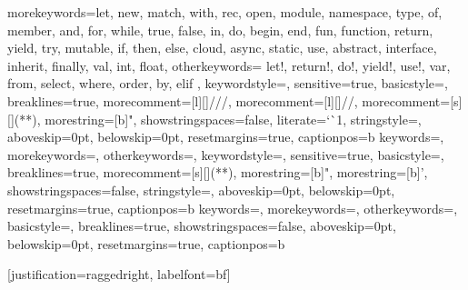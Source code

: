 %
{morekeywords={let, new, match, with, rec, open, module, namespace, type, of, member, %
and, for, while, true, false, in, do, begin, end, fun, function, return, yield, try, %
mutable, if, then, else, cloud, async, static, use, abstract,
interface, inherit, finally, val, int, float},
  otherkeywords={ let!, return!, do!, yield!, use!, var, from, select,
    where, order, by, elif },
  keywordstyle=\color{keywordsColor},
  sensitive=true,
  basicstyle=\ttfamily,
  breaklines=true,
  morecomment=[l][\color{commentsColor}]{///},
  morecomment=[l][\color{commentsColor}]{//},
  morecomment=[s][\color{commentsColor}]{{(*}{*)}},
  morestring=[b]",
  showstringspaces=false,
  literate={`}{\`}1,
  stringstyle=\color{stringsColor},
  aboveskip=0pt, 
  belowskip=0pt,
  resetmargins=true,
  captionpos=b
}
%
{keywords={},
  morekeywords={},
  otherkeywords={},
  keywordstyle=\color{keywordsColor},
  sensitive=true,
  basicstyle=\ttfamily, breaklines=true,
  morecomment=[s][\color{commentsColor}]{{(*}{*)}},
  morestring=[b]",
  morestring=[b]',
  showstringspaces=false,
  stringstyle=\color{stringsColor},
  aboveskip=0pt, 
  belowskip=0pt,
  resetmargins=true,
  captionpos=b
}
%
{keywords={},
  morekeywords={},
  otherkeywords={},
  basicstyle=\ttfamily, breaklines=true,
  showstringspaces=false,
  aboveskip=0pt, 
  belowskip=0pt,
  resetmargins=true,
  captionpos=b
}
\lstset{language=console}
\usepackage{caption}
 [justification=raggedright, labelfont=bf]{}
\captionsetup[lstlisting]{style=listing}

\usepackage{verbdef}
\verbdef{\cmdl}{>}


\newcommand{\fs}[2]{
  \begin{mdframed}[frametitlerulewidth=0.4pt,frametitlerule=true]
    
    \noindent\makebox[\linewidth]{\rule{\linewidth}{0.4pt}}
    
  \end{mdframed}
}
\newcommand{\fse}[2]{
  \begin{mdframed}[frametitle=#1.fsx,frametitlerulewidth=0.4pt,frametitlerule=true]
    \begin{minipage}{1\linewidth}
      
    \end{minipage}
  \end{mdframed}
}

